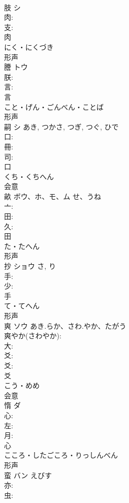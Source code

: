 \documentclass[8pt]{extreport}
\begin{document}
\begin{CJK}{UTF8}{min}
\\	肢	シ			
\\	肉: 
\\	支: 
\\	肉	
\\	にく・にくづき	
\\	形声 
\\	謄	トウ			
\\	朕: 
\\	言: 
\\	言	
\\	こと・げん・ごんべん・ことば	
\\	形声 
\\	嗣	シ		あき, つかさ, つぎ, つぐ, ひで	
\\	口: 
\\	冊: 
\\	司: 
\\	口	
\\	くち・くちへん	
\\	会意 
\\	畝	ボウ、ホ、モ、ム	せ、うね		
\\	亠: 
\\	田: 
\\	久: 
\\	田	
\\	た・たへん	
\\	形声 
\\	抄	ショウ		さ, り	
\\	手: 
\\	少: 
\\	手	
\\	て・てへん	
\\	形声 
\\	爽	ソウ	あき.らか、さわ.やか、たがう		
\\	爽やか(さわやか): 
\\	大: 
\\	爻: 
\\	爻: 
\\	爻	
\\	こう・めめ	
\\	会意 
\\	惰	ダ			
\\	心: 
\\	左: 
\\	月: 
\\	心	
\\	こころ・したごころ・りっしんべん	
\\	形声 
\\	蛮	バン	えびす		
\\	亦: 
\\	虫: 

\end{CJK}
\end{document}
